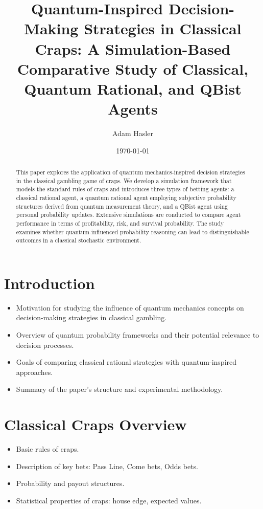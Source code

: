 \documentclass[12pt]{article}
\title{Quantum-Inspired Decision-Making Strategies in Classical Craps: A Simulation-Based Comparative Study of Classical, Quantum Rational, and QBist Agents}
\author{Adam Hasler}
\date{\today}
\begin{document}
\maketitle

\begin{abstract}
This paper explores the application of quantum mechanics-inspired decision strategies in the classical gambling game of craps. We develop a simulation framework that models the standard rules of craps and introduces three types of betting agents: a classical rational agent, a quantum rational agent employing subjective probability structures derived from quantum measurement theory, and a QBist agent using personal probability updates. Extensive simulations are conducted to compare agent performance in terms of profitability, risk, and survival probability. The study examines whether quantum-influenced probability reasoning can lead to distinguishable outcomes in a classical stochastic environment.
\end{abstract}

\tableofcontents

\newpage

\section{Introduction}
\begin{itemize}
    \item Motivation for studying the influence of quantum mechanics concepts on decision-making strategies in classical gambling.
    \item Overview of quantum probability frameworks and their potential relevance to decision processes.
    \item Goals of comparing classical rational strategies with quantum-inspired approaches.
    \item Summary of the paper's structure and experimental methodology.
\end{itemize}

\section{Classical Craps Overview}
\begin{itemize}
    \item Basic rules of craps.
    \item Description of key bets: Pass Line, Come bets, Odds bets.
    \item Probability and payout structures.
    \item Statistical properties of craps: house edge, expected values.
\end{itemize}
\end{document}
